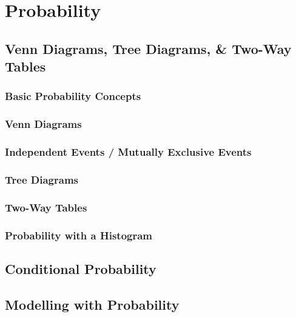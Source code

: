\documentclass[../maths.tex]{subfiles}
\begin{document}
\chapter{Probability}
\section{Venn Diagrams, Tree Diagrams, \& Two-Way Tables}
\subsection*{Basic Probability Concepts}
\subsection*{Venn Diagrams}
\subsection*{Independent Events / Mutually Exclusive Events}
\subsection*{Tree Diagrams}
\subsection*{Two-Way Tables}
\subsection*{Probability with a Histogram}
\section{Conditional Probability}
\section{Modelling with Probability}
\end{document}
